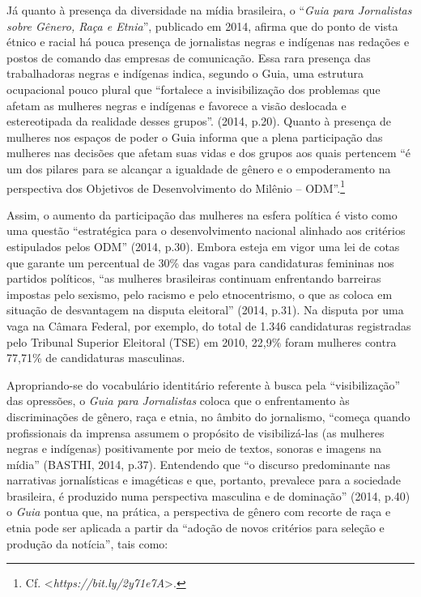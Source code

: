 Já quanto à presença da diversidade na mídia brasileira, o ``\emph{Guia
para Jornalistas sobre Gênero, Raça e Etnia}'', publicado em 2014,
afirma que do ponto de vista étnico e racial há pouca presença de
jornalistas negras e indígenas nas redações e postos de comando das
empresas de comunicação. Essa rara presença das trabalhadoras negras e
indígenas indica, segundo o Guia, uma estrutura ocupacional pouco plural
que ``fortalece a invisibilização dos problemas que afetam as mulheres
negras e indígenas e favorece a visão deslocada e estereotipada da
realidade desses grupos''. (2014, p.20). Quanto à presença de mulheres
nos espaços de poder o Guia informa que a plena participação das
mulheres nas decisões que afetam suas vidas e dos grupos aos quais
pertencem ``é um dos pilares para se alcançar a igualdade de gênero e o
empoderamento na perspectiva dos Objetivos de Desenvolvimento do Milênio
-- ODM''.\footnote{Cf. \textless{}\emph{https://bit.ly/2y71e7A}\textgreater{}.}

Assim, o aumento da participação das mulheres na esfera política é visto
como uma questão ``estratégica para o desenvolvimento nacional alinhado
aos critérios estipulados pelos ODM'' (2014, p.30). Embora esteja em
vigor uma lei de cotas que garante um percentual de 30\% das vagas para
candidaturas femininas nos partidos políticos, ``as mulheres brasileiras
continuam enfrentando barreiras impostas pelo sexismo, pelo racismo e
pelo etnocentrismo, o que as coloca em situação de desvantagem na
disputa eleitoral'' (2014, p.31). Na disputa por uma vaga na Câmara
Federal, por exemplo, do total de 1.346 candidaturas registradas pelo
Tribunal Superior Eleitoral (TSE) em 2010, 22,9\% foram mulheres contra
77,71\% de candidaturas masculinas.

Apropriando-se do vocabulário identitário referente à busca pela
``visibilização'' das opressões, o \emph{Guia para Jornalistas} coloca
que o enfrentamento às discriminações de gênero, raça e etnia, no âmbito
do jornalismo, ``começa quando profissionais da imprensa assumem o
propósito de visibilizá-las (as mulheres negras e indígenas)
positivamente por meio de textos, sonoras e imagens na mídia'' (BASTHI,
2014, p.37). Entendendo que ``o discurso predominante nas narrativas
jornalísticas e imagéticas e que, portanto, prevalece para a sociedade
brasileira, é produzido numa perspectiva masculina e de dominação''
(2014, p.40) o \emph{Guia} pontua que, na prática, a perspectiva de
gênero com recorte de raça e etnia pode ser aplicada a partir da
``adoção de novos critérios para seleção e produção da notícia'', tais
como:

